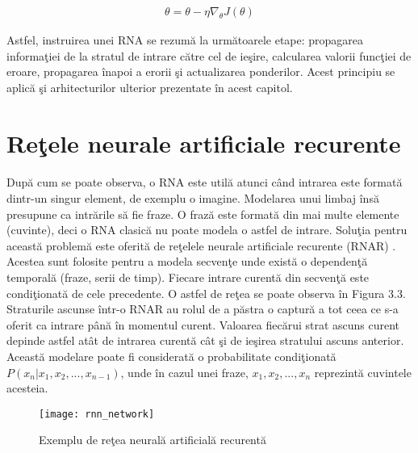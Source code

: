 \begin{equation}
\begin{split}
\theta=\theta - \eta \nabla_{\theta}J(\theta)
\end{split}
\end{equation}

Astfel, instruirea unei RNA se rezum\u a la urm\u atoarele etape: propagarea informa\c tiei de la stratul de intrare c\u atre cel de ie\c sire, calcularea valorii func\c tiei de eroare, propagarea \^ inapoi a erorii \c si actualizarea ponderilor. Acest principiu se aplic\u a \c si arhitecturilor ulterior prezentate \^ in acest capitol.

\section{Re\c tele neurale artificiale recurente}

\paragraph{}
Dup\u a cum se poate observa, o RNA este util\u a atunci c\^ and intrarea este format\u a dintr-un singur element, de exemplu o imagine. Modelarea unui limbaj \^ ins\u a presupune ca intr\u arile s\u a fie fraze. O fraz\u a este format\u a din mai multe elemente (cuvinte), deci o RNA clasic\u a nu poate modela o astfel de intrare. Solu\c tia pentru aceast\u a problem\u a este oferit\u a de re\c telele neurale artificiale recurente (RNAR) \cite{rnns}. Acestea sunt folosite pentru a modela secven\c te unde exist\u a o dependen\c t\u a temporal\u a (fraze, serii de timp). Fiecare intrare curent\u a din secven\c t\u a este condi\c tionat\u a de cele precedente. O astfel de re\c tea se poate observa \^ in Figura 3.3. Straturile ascunse \^ intr-o RNAR au rolul de a p\u astra o captur\u a a tot ceea ce s-a oferit ca intrare p\^ an\u a \^ in momentul curent. Valoarea fiec\u arui strat ascuns curent depinde astfel at\^ at de intrarea curent\u a c\^ at \c si de ie\c sirea stratului ascuns anterior. Aceast\u a modelare poate fi considerat\u a o probabilitate condi\c tionat\u a \( P(x_{n} | x_{1}, x_{2},..., x_{n-1}) \), unde \^ in cazul unei fraze, \(x_{1}, x_{2},..., x_{n}\) reprezint\u a cuvintele acesteia. 

\begin{figure}[H]
\centering
\texttt{[image: rnn\_network]}
\caption{Exemplu de re\c tea neural\u a artificial\u a recurent\u a}
\end{figure}

